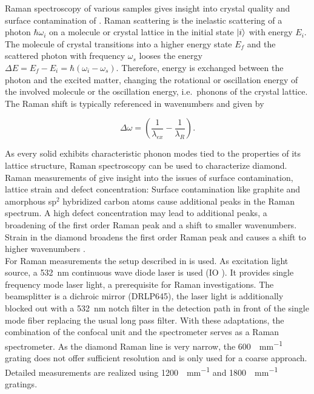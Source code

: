			Raman spectroscopy of various samples gives insight into crystal quality and surface contamination of \nds.
			Raman scattering is the inelastic scattering of a photon $\hbar\omega_i$ on a molecule or crystal lattice in the initial state $\ket{i}$ with energy $E_i$.
			The molecule of crystal transitions into a higher energy state $E_f$ and the scattered photon with frequency $\omega_s$ looses the energy $\Delta E = E_f - E_i = \hbar(\omega_i-\omega_s)$.
			Therefore, energy is exchanged between the photon and the excited matter, changing the rotational or oscillation energy of the involved molecule or the oscillation energy, i.e.\ phonons of the crystal lattice.
			The Raman shift is typically referenced in wavenumbers and given by

			\begin{equation}
				\Delta \omega = \left( \frac{1}{\lambda_{ex}}-\frac{1}{\lambda_R}\right).
			\end{equation}

			As every solid exhibits characteristic phonon modes tied to the properties of its lattice structure, Raman spectroscopy can be used to characterize diamond.
			Raman measurements of \nds give insight into the issues of surface contamination, lattice strain and defect concentration:
			Surface contamination like graphite and amorphous sp$^2$ hybridized carbon atoms cause additional peaks in the Raman spectrum.
			A high defect concentration may lead to additional peaks, a broadening of the first order Raman peak and a shift to smaller wavenumbers.
			Strain in the diamond broadens the first order Raman peak and causes a shift to higher wavenumbers \cite{Zaitsev2001,Prawer2004,Orwa2000}.
			\\
			For Raman measurements the setup described in  is used.
			As excitation light source, a \SI{532}{nm} continuous wave diode laser is used (IO ).
			It provides single frequency mode laser light, a prerequisite for Raman investigations.
			The beamsplitter is a dichroic mirror (DRLP645), the laser light is additionally blocked out with a \SI{532}{\nm} notch filter in the detection path in front of the single mode fiber replacing the usual long pass filter.
			With these adaptations, the combination of the confocal unit and the spectrometer serves as a Raman spectrometer.
			As the diamond Raman line is very narrow, the \SI[per-mode=symbol]{600}{\lines\per\mm} grating does not offer sufficient resolution and is only used for a coarse approach. Detailed measurements are realized using \SI[per-mode=symbol]{1200}{\lines\per\mm} and \SI[per-mode=symbol]{1800}{\lines\per\mm} gratings.
			\\

